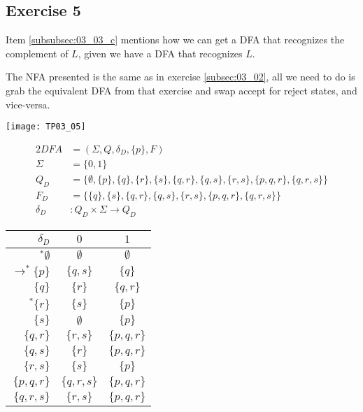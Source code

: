 {\subsection{Exercise 5}
\begin{remark}
	Item \ref{subsubsec:03_03_c} mentions how we can get a DFA that recognizes the complement of $L$, given we have a DFA that recognizes $L$.
\end{remark}
\begin{remark}
	The NFA presented is the same as in exercise \ref{subsec:03_02}, all we need to do is grab the equivalent DFA from that exercise and swap accept for reject states, and vice-versa.
\end{remark}
\begin{center} \texttt{[image: TP03\_05]} \end{center}
\begin{alignat*}{2}
	DFA       &= (\Sigma, Q, \delta_D, \{p\}, F)\\
	\Sigma    &= \{0,1\}\\
	Q_D       &= \{\emptyset,\{p\},\{q\},\{r\},\{s\},\{q,r\},\{q,s\},\{r,s\},\{p,q,r\},\{q,r,s\}\}\\
	F_D       &= \{\{q\},\{s\},\{q,r\},\{q,s\},\{r,s\},\{p,q,r\},\{q,r,s\}\}\\
	\delta_D &\colon Q_D \times \Sigma \rightarrow Q_D
\end{alignat*}
\begin{center}
\begin{tabular}{ r | c c }
 $\delta_D$ & $0$ & $1$ \\
 \hline
 $^* \emptyset             $ & $\emptyset  $ & $\emptyset  $ \\
 $\rightarrow^* \{p      \}$ & $\{  q,  s\}$ & $\{  q    \}$ \\  
 $                 \{  q    \}$ & $\{    r  \}$ & $\{  q,r  \}$ \\
 $^*            \{    r  \}$ & $\{      s\}$ & $\{p      \}$ \\
 $                 \{      s\}$ & $\emptyset  $ & $\{p      \}$ \\
 $                 \{  q,r  \}$ & $\{    r,s\}$ & $\{p,q,r  \}$ \\
 $                 \{  q,  s\}$ & $\{    r  \}$ & $\{p,q,r  \}$ \\
 $                 \{    r,s\}$ & $\{      s\}$ & $\{p      \}$ \\
 $                 \{p,q,r  \}$ & $\{  q,r,s\}$ & $\{p,q,r  \}$ \\
 $                 \{  q,r,s\}$ & $\{    r,s\}$ & $\{p,q,r  \}$
\end{tabular}
\end{center}
\pagebreak
}

